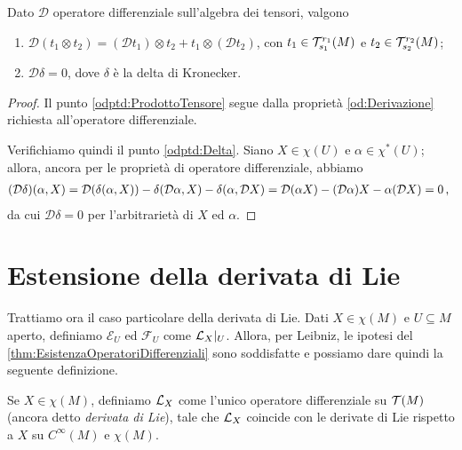\begin{corollary} \label{cor:OperatoreDifferenzialeProdottoTensoreEDelta}
	Dato $\mathcal D$ operatore differenziale sull'algebra dei tensori, valgono
	\begin{enumerate}
		\item $\mathcal D(t_1\otimes t_2) = (\mathcal D t_1) \otimes t_2 + t_1\otimes (\mathcal D t_2)$, con $t_1 \in \mathcal T^{r_1}_{s_1}(M)$ e $t_2 \in \mathcal T^{r_2}_{s_2}(M)$; \label{odptd:ProdottoTensore}
		\item $\mathcal D\delta = 0$, dove $\delta$ è la delta di Kronecker. \label{odptd:Delta}
	\end{enumerate}
\end{corollary}
\begin{proof}
	Il punto \ref{odptd:ProdottoTensore} segue dalla proprietà \ref{od:Derivazione} richiesta all'operatore differenziale. 
	
	Verifichiamo quindi il punto \ref{odptd:Delta}.	
	Siano $X\in\chi(U)$ e $\alpha\in\chi^*(U)$; allora, ancora per le proprietà di operatore differenziale, abbiamo
	\begin{align*}
	(\mathcal D\delta)(\alpha, X) = \mathcal D(\delta(\alpha,X)) - \delta(\mathcal D\alpha,X) - \delta(\alpha,\mathcal D X) = \mathcal D (\alpha X) - (\mathcal D\alpha)X - \alpha(\mathcal DX) = 0\, \text{, }
	\end{align*}
	da cui $\mathcal D\delta = 0$ per l'arbitrarietà di $X$ ed $\alpha$.
\end{proof}

\section{Estensione della derivata di Lie} %

Trattiamo ora il caso particolare della derivata di Lie.
Dati $X\in\chi(M)$ e $U\subseteq M$ aperto, definiamo $\mathcal E_U$ ed $\mathcal F_U$ come $\mathcal L_X|_ U$.
Allora, per Leibniz, le ipotesi del \cref{thm:EsistenzaOperatoriDifferenziali} sono soddisfatte e possiamo dare quindi la seguente definizione.

\begin{definition} 
	Se $X\in\chi(M)$, definiamo $\mathcal L_X$ come l'unico operatore differenziale su $\mathcal T(M)$ (ancora detto \emph{derivata di Lie}), tale che $\mathcal L_X$ coincide con le derivate di Lie rispetto a $X$ su $C^\infty(M)$ e $\chi(M)$.
\end{definition}

